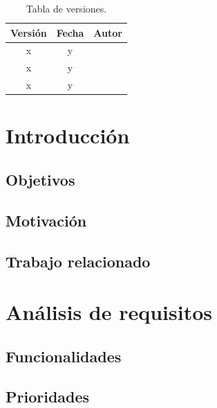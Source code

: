 \documentclass[a4paper,openright,12pt]{article}
\begin{document}
\begin{flushright}
\begin{table}[hbtp]
\begin{center}

\caption{Tabla de versiones.}
\label{tabla:versiones}
\small
\vspace{1ex}

\begin{tabular}{|c|c|l|}
\hline
Versión & Fecha & Autor \\
\hline \hline
x & y & \\ \hline
x & y & \\ \hline
x & y & \\ \hline
\end{tabular}

\end{center}
\end{table}
\end{flushright}


\newpage
{}


\section{Introducción}\label{cap.introduccion}

\subsection{Objetivos}

\subsection{Motivación}

\subsection{Trabajo relacionado}


\section{Análisis de requisitos}

\subsection{Funcionalidades}

\subsection{Prioridades}
\end{document}
